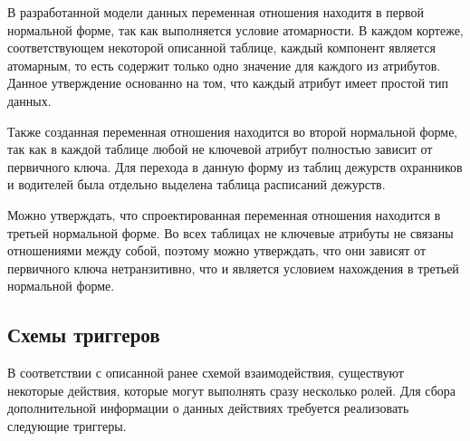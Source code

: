 В разработанной модели данных переменная отношения находитя в первой нормальной форме, так как выполняется условие атомарности. В каждом кортеже, соответствующем некоторой описанной таблице, каждый компонент является атомарным, то есть содержит только одно значение для каждого из атрибутов\cite{norm_db2}. Данное утверждение основанно на том, что каждый атрибут имеет простой тип данных.

Также созданная переменная отношения находится во второй нормальной форме, так как в каждой таблице любой не ключевой атрибут полностью зависит от первичного ключа. Для перехода в данную форму из таблиц дежурств охранников и водителей была отдельно выделена таблица расписаний дежурств.

Можно утверждать, что спроектированная переменная отношения находится в третьей нормальной форме. Во всех таблицах не ключевые атрибуты не связаны отношениями между собой, поэтому можно утверждать, что они зависят от первичного ключа нетранзитивно, что и является условием нахождения в третьей нормальной форме.

\subsection{Схемы триггеров}
В соответствии с описанной ранее схемой взаимодействия, существуют некоторые действия, которые могут выполнять сразу несколько ролей. Для сбора дополнительной информации о данных действиях требуется реализовать следующие триггеры. \\



